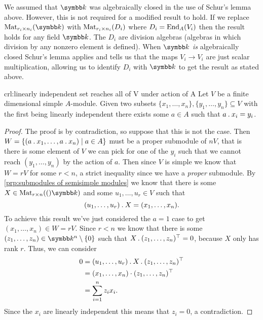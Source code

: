 \begin{remark}{}{}
    We assumed that \(\field\) was algebraically closed in the use of Schur's lemma above.
    However, this is not required for a modified result to hold.
    If we replace \(\matrices[r_i]{n_i}{\field}\) with \(\matrices[r_i]{n_i}{D_i}\) where \(D_i = \operatorname{End}_A (V_i)\) then the result holds for any field \(\field\).
    The \(D_i\) are division algebras (algebras in which division by any nonzero element is defined).
    When \(\field\) \emph{is} algebraically closed Schur's lemma applies and tells us that the maps \(V_i \to V_i\) are just scalar multiplication, allowing us to identify \(D_i\) with \(\field\) to get the result as stated above.
\end{remark}

\begin{crl}{}{crl:linearly independent set reaches all of V under action of A}
    Let \(V\) be a finite dimensional simple \(A\)-module.
    Given two subsets \(\{x_1, \dotsc, x_n\}, \{y_1, \dotsc, y_n\} \subseteq V\) with the first being linearly independent there exists some \(a \in A\) such that \(a \mathbin{.} x_i = y_i\).
    \begin{proof}
        The proof is by contradiction, so suppose that this is not the case.
        Then \(W = \{(a \mathbin{.} x_1, \dotsc, a \mathbin{.} x_n) \mid a \in A\}\) must be a proper submodule of \(nV\), that is there is some element of \(V\) we can pick for one of the \(y_i\) such that we cannot reach \((y_1, \dotsc, y_n)\) by the action of \(a\).
        Then since \(V\) is simple we know that \(W = rV\) for some \(r < n\), a strict inequality since we have a \emph{proper} submodule.
        By \cref{prp:submodules of semisimple modules} we know that there is some \(X \in \matrices[r]{n}(\field)\) and some \(u_1, \dotsc, u_r \in V\) such that
        \begin{equation}
            (u_1, \dotsc, u_r) \mathbin{.} X = (x_1, \dotsc, x_n).
        \end{equation}
        To achieve this result we've just considered the \(a = 1\) case to get \((x_1, \dotsc, x_n) \in W = rV\).
        Since \(r < n\) we know that there is some \((z_1, \dotsc, z_n) \in \field^n \setminus \{0\}\) such that \(X \mathbin{.} (z_1, \dotsc, z_n)^{\top} = 0\), because \(X\) only has rank \(r\).
        Thus, we can consider
        \begin{align}
            0 &= (u_1, \dotsc, u_r) \mathbin{.} X \mathbin{.} (z_1, \dotsc, z_n)^{\top}\\
            &= (x_1, \dotsc, x_n) \cdot (z_1, \dotsc, z_n)^{\top}\\
            &= \sum_{i=1}^n z_i x_i.
        \end{align}
        Since the \(x_i\) are linearly independent this means that \(z_i = 0\), a contradiction. 
    \end{proof}
\end{crl}

